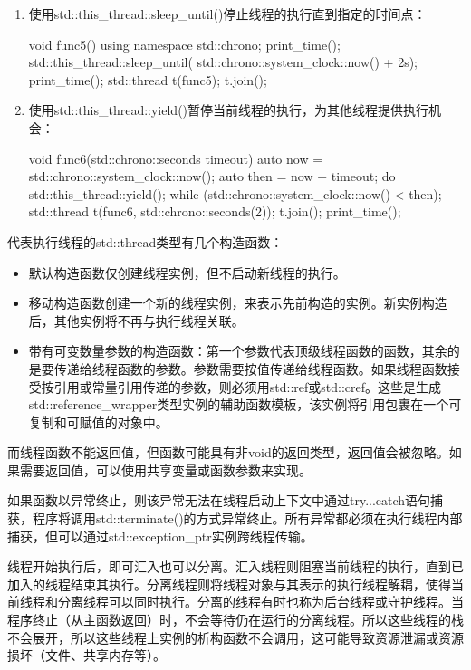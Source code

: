 \begin{enumerate}
\item
使用std::this\_thread::sleep\_until()停止线程的执行直到指定的时间点：

\begin{cpp}
void func5()
{
    using namespace std::chrono;
    print_time();
    std::this_thread::sleep_until(
        std::chrono::system_clock::now() + 2s);
    print_time();
}
std::thread t(func5);
t.join();
\end{cpp}

\item
使用std::this\_thread::yield()暂停当前线程的执行，为其他线程提供执行机会：

\begin{cpp}
void func6(std::chrono::seconds timeout)
{
    auto now = std::chrono::system_clock::now();
    auto then = now + timeout;
    do
    {
        std::this_thread::yield();
    } while (std::chrono::system_clock::now() < then);
}
std::thread t(func6, std::chrono::seconds(2));
t.join();
print_time();
\end{cpp}

\end{enumerate}


代表执行线程的std::thread类型有几个构造函数：

\begin{itemize}
\item
默认构造函数仅创建线程实例，但不启动新线程的执行。

\item
移动构造函数创建一个新的线程实例，来表示先前构造的实例。新实例构造后，其他实例将不再与执行线程关联。

\item
带有可变数量参数的构造函数：第一个参数代表顶级线程函数的函数，其余的是要传递给线程函数的参数。参数需要按值传递给线程函数。如果线程函数接受按引用或常量引用传递的参数，则必须用std::ref或std::cref。这些是生成std::reference\_wrapper类型实例的辅助函数模板，该实例将引用包裹在一个可复制和可赋值的对象中。
\end{itemize}

而线程函数不能返回值，但函数可能具有非void的返回类型，返回值会被忽略。如果需要返回值，可以使用共享变量或函数参数来实现。

如果函数以异常终止，则该异常无法在线程启动上下文中通过try...catch语句捕获，程序将调用std::terminate()的方式异常终止。所有异常都必须在执行线程内部捕获，但可以通过std::exception\_ptr实例跨线程传输。

线程开始执行后，即可汇入也可以分离。汇入线程则阻塞当前线程的执行，直到已加入的线程结束其执行。分离线程则将线程对象与其表示的执行线程解耦，使得当前线程和分离线程可以同时执行。分离的线程有时也称为后台线程或守护线程。当程序终止（从主函数返回）时，不会等待仍在运行的分离线程。所以这些线程的栈不会展开，所以这些线程上实例的析构函数不会调用，这可能导致资源泄漏或资源损坏（文件、共享内存等）。


